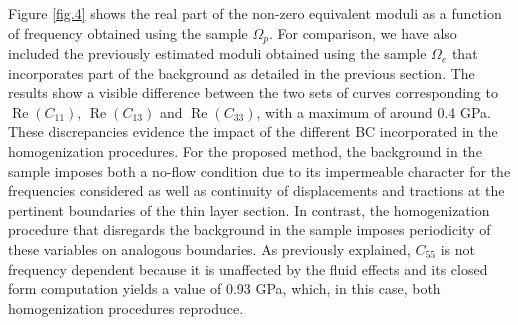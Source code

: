 \documentclass[draft]{agujournal2019}
\renewcommand{\Re}{\operatorname{Re} }
\begin{document}
Figure \ref{fig.4} shows the real part of the non-zero equivalent moduli as a function of frequency obtained using the sample $\Omega_p$. For comparison, we have also included the previously estimated moduli obtained using the sample $\Omega_e$ that incorporates part of the background as detailed in the previous section. The results show  a visible difference between the two sets of curves corresponding to $\Re(C_{11})$, $\Re(C_{13})$ and $\Re(C_{33})$, with a maximum of around 0.4 GPa. These discrepancies evidence the impact of the different BC incorporated in the homogenization procedures. For the proposed method, the  background in the sample imposes both a no-flow condition due to its impermeable character for the frequencies considered as well as continuity of displacements and tractions at the pertinent boundaries of the thin layer section. In contrast, the  homogenization procedure that disregards the background in the sample imposes periodicity of these variables on analogous boundaries. 
As previously explained, $C_{55}$ is not frequency dependent because it is unaffected by the fluid effects and its closed form computation yields a value of 0.93 GPa, which, in this case, both homogenization procedures reproduce.
\end{document}
